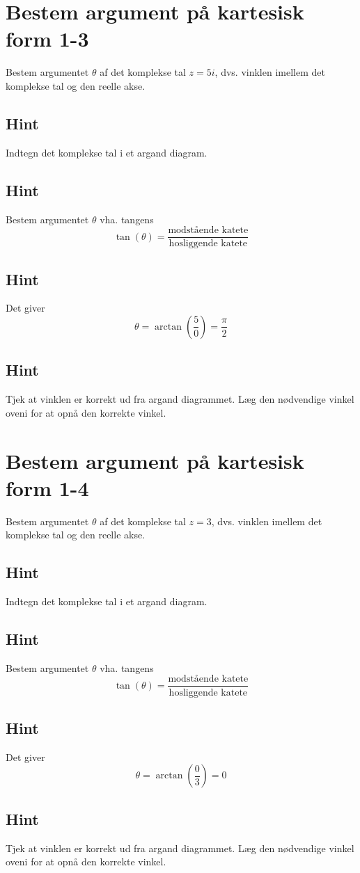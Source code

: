 \documentclass{article}
\newenvironment{exercise}[1]{\newpage\section{#1}}{}
\newcommand{\answerbox}[1]{\fbox{$#1$}}
\newcommand{\hint}{\subsection*{Hint}}
\begin{document}
\begin{exercise}{Bestem argument på kartesisk form 1-3}
	
	Bestem argumentet $\theta$ af det komplekse tal $z=5i$, dvs. vinklen imellem det komplekse tal og den reelle akse.
	
	\answerbox{ \frac{\pi}{2}}
	
	
	\hint 
	
	Indtegn det komplekse tal i et argand diagram.
	
	
	\hint
	
	Bestem argumentet $\theta$ vha. tangens
	\[
	\tan(\theta)=\frac{\textrm{modstående katete}}{\textrm{hosliggende katete}}
	\]
	
	\hint 
	
	Det giver
	\[
	\theta = \arctan \left(\frac{5}{0}\right) = \frac{\pi}{2}
	\]
	
	\hint
	
	Tjek at vinklen er korrekt ud fra argand diagrammet. Læg den nødvendige vinkel oveni for at opnå den korrekte vinkel. 
	
	
\end{exercise}

\newpage

\begin{exercise}{Bestem argument på kartesisk form 1-4}
	
	Bestem argumentet $\theta$ af det komplekse tal $z=3$, dvs. vinklen imellem det komplekse tal og den reelle akse.
	
	\answerbox{0}
	
	
	\hint 
	
	Indtegn det komplekse tal i et argand diagram.
	
	
	\hint
	
	Bestem argumentet $\theta$ vha. tangens
	\[
	\tan(\theta)=\frac{\textrm{modstående katete}}{\textrm{hosliggende katete}}
	\]
	
	\hint 
	
	Det giver
	\[
	\theta = \arctan \left(\frac{0}{3}\right) = 0
	\]
	
	\hint
	
	Tjek at vinklen er korrekt ud fra argand diagrammet. Læg den nødvendige vinkel oveni for at opnå den korrekte vinkel. 
	
	
\end{exercise}

\newpage
\end{document}
